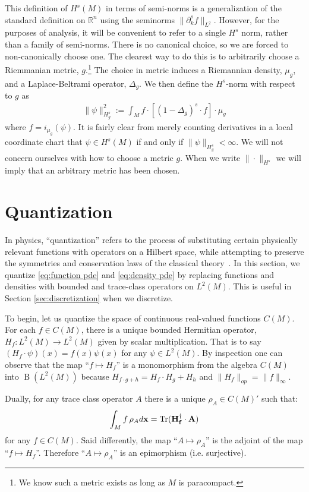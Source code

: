 \documentclass[final,leqno]{siamart}
\DeclareMathOperator{\Tr}{Tr}
\begin{document}
This definition of $H^s(M)$ in terms of semi-norms is a generalization of the standard definition on $\mathbb{R}^n$ using the seminorms $\| \partial_k^s f \|_{L^2}$.
However, for the purposes of analysis, it will be convenient to refer to a single $H^s$ norm, rather than a family of semi-norms.
There is no canonical choice, so we are forced to non-canonically choose one.
The clearest way to do this is to arbitrarily choose a Riemmanian metric, $g$.\footnote{We know such a metric exists as long as $M$ is paracompact.}
The choice in metric induces a Riemannian density, $\mu_g$, and a Laplace-Beltrami operator, $\Delta_g$.
We then define the $H^s$-norm with respect to $g$ as
\begin{align*}
	\| \psi \|_{H^s_g}^2 := \int_M f \cdot [ (1-\Delta_g)^s \cdot f ] \cdot \mu_g
\end{align*}
where $f = i_{\mu_g}(\psi)$.
It is fairly clear from merely counting derivatives in a local coordinate chart that $\psi \in H^s(M)$ if and only if $\| \psi \|_{H^s_g} < \infty$.
We will not concern ourselves with how to choose a metric $g$.
When we write $\| \cdot \|_{H^s}$ we will imply that an arbitrary metric has been chosen.

\section{Quantization} \label{sec:quantization}
In physics, ``quantization'' refers to the process of substituting certain physically relevant functions with operators on a Hilbert space, while attempting to preserve the symmetries and conservation laws of the classical theory~\cite{BatesWeinstein1997,GuilleminSternberg1970}.
In this section, we quantize \eqref{eq:function pde} and \eqref{eq:density pde} by replacing functions and densities with bounded and trace-class operators on $L^{2}(M)$.
This is useful in Section \ref{sec:discretization} when we discretize.

To begin, let us quantize the space of continuous real-valued functions $C(M)$.
For each $f \in C(M)$, there is a unique bounded Hermitian operator, $H_{f} : L^{2}(M) \to L^{2}(M)$ given by scalar multiplication.
That is to say $(H_{f} \cdot \psi) (x) = f(x) \psi(x)$ for any $\psi \in L^{2}(M)$.
By inspection one can observe that the map ``$f \mapsto H_{f}$'' is a monomorphism from the algebra $C(M)$ into $\operatorname{B}( L^2(M))$ because $H_{f\cdot g + h} = H_{f} \cdot H_{g} + H_{h}$ and $\| H_{f} \|_{op} = \| f \|_{\infty}$.

Dually, for any trace class operator $A$ there is a unique $\rho_{A} \in C(M)'$ such that: 
\begin{align*}
	 \int_M f \, \rho_{A} d\bf{x} = \Tr ( H_{f}^{\dagger} \cdot A )
\end{align*}
for any $f \in C(M)$.
Said differently, the map ``$A \mapsto \rho_{A}$'' is the adjoint of the map ``$f \mapsto H_{f}$''. Therefore ``$A \mapsto \rho_{A}$'' is an epimorphism (i.e. surjective).
\end{document}
